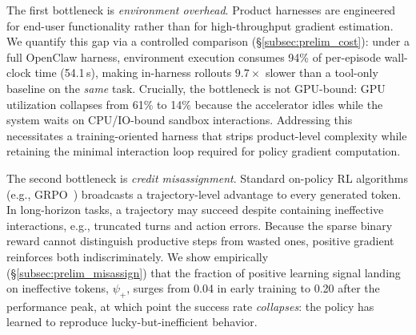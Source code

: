 \documentclass[letterpaper]{article} %
\begin{document}
The first bottleneck is \emph{environment overhead}. Product harnesses are engineered for end-user functionality
rather than for high-throughput gradient estimation. 
We quantify this gap via a controlled comparison (\S\ref{subsec:prelim_cost}): under a full OpenClaw harness, environment execution consumes 94\% of per-episode wall-clock time (54.1\,s), making in-harness rollouts $9.7\times$ slower than a tool-only baseline on the \emph{same} task. 
Crucially, the bottleneck is not GPU-bound: GPU utilization collapses from 61\% to 14\% because the accelerator idles while the system waits on CPU/IO-bound sandbox interactions. 
Addressing this necessitates a training-oriented harness that strips product-level complexity while retaining the minimal interaction loop required for policy gradient computation.

The second bottleneck is \emph{credit misassignment}. 
Standard on-policy RL algorithms (e.g., GRPO~\citep{guo2025deepseek}) broadcasts a trajectory-level advantage to every generated token. 
In long-horizon tasks, a trajectory may succeed despite containing ineffective interactions, e.g., truncated turns and action errors. 
Because the sparse binary reward cannot distinguish productive steps from wasted ones, positive gradient reinforces both indiscriminately.
We show empirically (\S\ref{subsec:prelim_misassign}) that the fraction of positive learning signal landing on ineffective tokens, $\psi_+$, surges from 0.04 in early training to 0.20 after the performance peak, at which point the success rate \emph{collapses}: the policy has learned to reproduce lucky-but-inefficient behavior.
\end{document}
